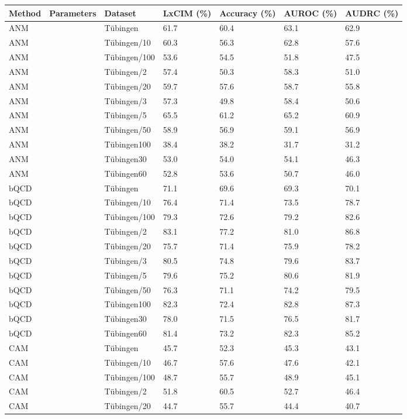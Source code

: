 \begin{tabular}{lllllll}
\toprule
Method & Parameters & Dataset & LxCIM (\%) & Accuracy (\%) & AUROC (\%) & AUDRC (\%) \\
\midrule
ANM &  & Tübingen & 61.7 & 60.4 & 63.1 & 62.9 \\
ANM &  & Tübingen/10 & 60.3 & 56.3 & 62.8 & 57.6 \\
ANM &  & Tübingen/100 & 53.6 & 54.5 & 51.8 & 47.5 \\
ANM &  & Tübingen/2 & 57.4 & 50.3 & 58.3 & 51.0 \\
ANM &  & Tübingen/20 & 59.7 & 57.6 & 58.7 & 55.8 \\
ANM &  & Tübingen/3 & 57.3 & 49.8 & 58.4 & 50.6 \\
ANM &  & Tübingen/5 & 65.5 & 61.2 & 65.2 & 60.9 \\
ANM &  & Tübingen/50 & 58.9 & 56.9 & 59.1 & 56.9 \\
ANM &  & Tübingen100 & 38.4 & 38.2 & 31.7 & 31.2 \\
ANM &  & Tübingen30 & 53.0 & 54.0 & 54.1 & 46.3 \\
ANM &  & Tübingen60 & 52.8 & 53.6 & 50.7 & 46.0 \\
bQCD &  & Tübingen & 71.1 & 69.6 & 69.3 & 70.1 \\
bQCD &  & Tübingen/10 & 76.4 & 71.4 & 73.5 & 78.7 \\
bQCD &  & Tübingen/100 & 79.3 & 72.6 & 79.2 & 82.6 \\
bQCD &  & Tübingen/2 & 83.1 & 77.2 & 81.0 & 86.8 \\
bQCD &  & Tübingen/20 & 75.7 & 71.4 & 75.9 & 78.2 \\
bQCD &  & Tübingen/3 & 80.5 & 74.8 & 79.6 & 83.7 \\
bQCD &  & Tübingen/5 & 79.6 & 75.2 & 80.6 & 81.9 \\
bQCD &  & Tübingen/50 & 76.3 & 71.1 & 74.2 & 79.5 \\
bQCD &  & Tübingen100 & 82.3 & 72.4 & 82.8 & 87.3 \\
bQCD &  & Tübingen30 & 78.0 & 71.5 & 76.5 & 81.7 \\
bQCD &  & Tübingen60 & 81.4 & 73.2 & 82.3 & 85.2 \\
CAM &  & Tübingen & 45.7 & 52.3 & 45.3 & 43.1 \\
CAM &  & Tübingen/10 & 46.7 & 57.6 & 47.6 & 42.1 \\
CAM &  & Tübingen/100 & 48.7 & 55.7 & 48.9 & 45.1 \\
CAM &  & Tübingen/2 & 51.8 & 60.5 & 52.7 & 46.4 \\
CAM &  & Tübingen/20 & 44.7 & 55.7 & 44.4 & 40.7 \\

\end{tabular}
